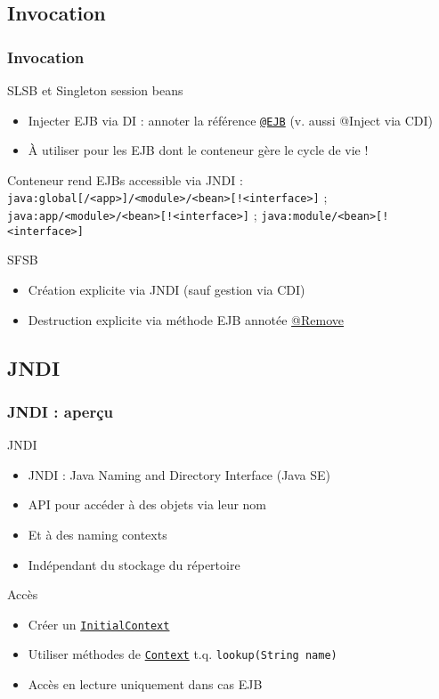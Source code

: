 \documentclass[english, french]{beamer}
\begin{document}
\subsection{Invocation}
\begin{frame}
	\frametitle{Invocation}
	\begin{block}{SLSB et Singleton session beans}
		\begin{itemize}
			\item Injecter EJB via DI : annoter la référence \href{http://docs.oracle.com/javaee/7/api/javax/ejb/EJB.html}{\texttt{@EJB}} {\tiny (v. aussi @Inject via CDI)}
			\item À utiliser pour les EJB dont le conteneur gère le cycle de vie !
		\end{itemize}
	\end{block}
	Conteneur rend EJBs accessible via JNDI : \texttt{java:global[/<app>]/<module>/<bean>[!<interface>]} ; \texttt{java:app/<module>/<bean>[!<interface>]} ; \texttt{java:module/<bean>[!<interface>]}
	\begin{block}{SFSB}
		\begin{itemize}
			\item Création explicite via JNDI {\tiny (sauf gestion via CDI)}
			\item Destruction explicite via méthode EJB annotée \href{http://docs.oracle.com/javaee/7/api/javax/ejb/Remove.html}{@Remove}
		\end{itemize}
	\end{block}
\end{frame}

\subsection{JNDI}
\begin{frame}
	\frametitle{JNDI : aperçu}
	\begin{block}{JNDI}
		\begin{itemize}
			\item JNDI : Java Naming and Directory Interface (Java SE)
			\item API pour accéder à des objets via leur nom
			\item Et à des \og{}naming contexts\fg{}
			\item Indépendant du stockage du répertoire
		\end{itemize}
	\end{block}
	\begin{block}{Accès}
		\begin{itemize}
			\item Créer un \href{http://docs.oracle.com/javase/8/docs/api/javax/naming/InitialContext.html}{\texttt{InitialContext}}
			\item Utiliser méthodes de \href{http://docs.oracle.com/javase/8/docs/api/javax/naming/Context.html}{\texttt{Context}} t.q. \texttt{lookup(String name)}
			\item Accès en lecture uniquement dans cas EJB
		\end{itemize}
	\end{block}
\end{frame}
\end{document}
